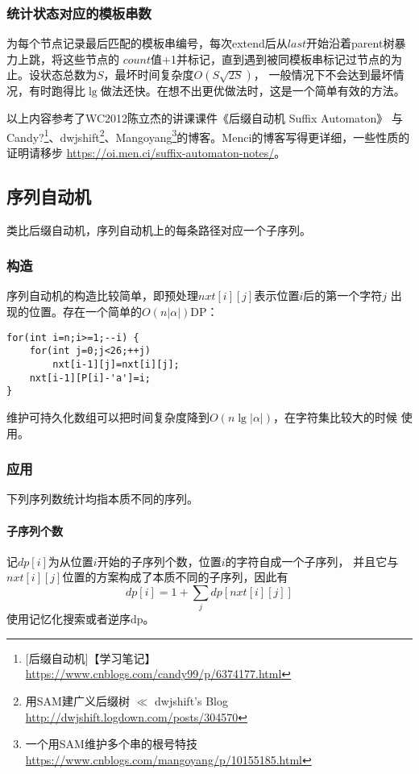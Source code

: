 \subsubsection{统计状态对应的模板串数}
为每个节点记录最后匹配的模板串编号，每次extend后从$last$开始沿着parent树暴力上跳，将这些节点的
$count$值+1并标记，直到遇到被同模板串标记过节点的为止。设状态总数为$S$，最坏时间复杂度$O(S\sqrt{2S})$，
一般情况下不会达到最坏情况，有时跑得比$\lg$做法还快。在想不出更优做法时，这是一个简单有效的方法。

以上内容参考了WC2012陈立杰的讲课课件《后缀自动机 Suffix Automaton》
与Candy?\footnote{[后缀自动机]【学习笔记】
    \url{https://www.cnblogs.com/candy99/p/6374177.html}
}、dwjshift\footnote{
    用SAM建广义后缀树 $\ll$ dwjshift's Blog
    \url{http://dwjshift.logdown.com/posts/304570}
}、Mangoyang\footnote{
    一个用SAM维护多个串的根号特技
    \url{https://www.cnblogs.com/mangoyang/p/10155185.html}
}的博客。Menci的博客写得更详细，一些性质的证明请移步
\url{https://oi.men.ci/suffix-automaton-notes/}。

\subsection{序列自动机}
类比后缀自动机，序列自动机上的每条路径对应一个子序列。

\subsubsection{构造}
序列自动机的构造比较简单，即预处理$nxt[i][j]$表示位置$i$后的第一个字符$j$
出现的位置。存在一个简单的$O(n|\alpha|)$DP：
\begin{lstlisting}
for(int i=n;i>=1;--i) {
    for(int j=0;j<26;++j)
        nxt[i-1][j]=nxt[i][j];
    nxt[i-1][P[i]-'a']=i;
}
\end{lstlisting}

维护可持久化数组可以把时间复杂度降到$O(n\lg |\alpha|)$，在字符集比较大的时候
使用。
\subsubsection{应用}
下列序列数统计均指本质不同的序列。
\paragraph{子序列个数}
记$dp[i]$为从位置$i$开始的子序列个数，位置$i$的字符自成一个子序列，
并且它与$nxt[i][j]$位置的方案构成了本质不同的子序列，因此有
\begin{displaymath}
    dp[i]=1+\sum_j{dp[nxt[i][j]]}
\end{displaymath}
使用记忆化搜索或者逆序dp。
